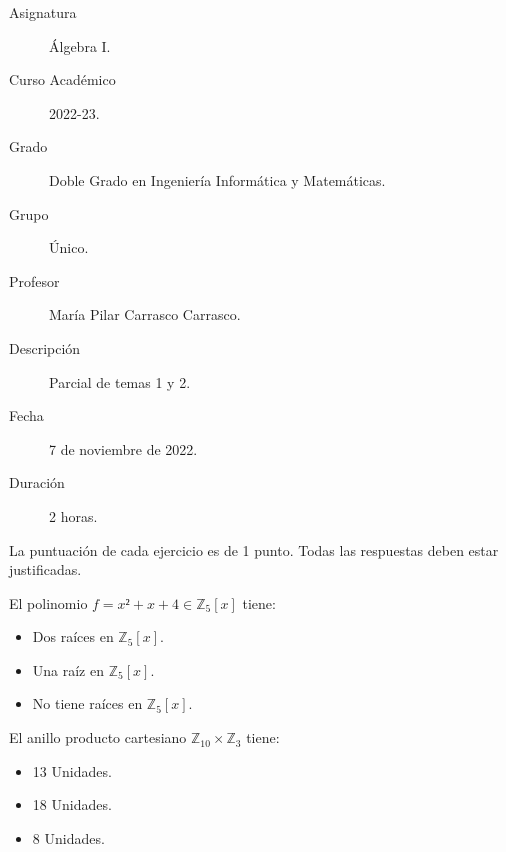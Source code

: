 \documentclass[12pt]{article}
\begin{document}

    
    

    
    \begin{description}
        \item[Asignatura] Álgebra I.
        \item[Curso Académico] 2022-23.
        \item[Grado] Doble Grado en Ingeniería Informática y Matemáticas.
        \item[Grupo] Único.
        \item[Profesor] María Pilar Carrasco Carrasco.
        \item[Descripción] Parcial de temas 1 y 2.
        \item[Fecha] 7 de noviembre de 2022.
        \item[Duración] 2 horas.
    
    \end{description}
    \newpage
    
    \noindent
    La puntuación de cada ejercicio es de 1 punto.\newline
    Todas las respuestas deben estar justificadas.

    \begin{ejercicio}
        El polinomio $f = x² + x + 4 \in \mathbb{Z}_5[x]$ tiene:
        \begin{itemize}
            \item Dos raíces en $\mathbb{Z}_5[x]$.
            \item Una raíz en $\mathbb{Z}_5[x]$.
            \item No tiene raíces en $\mathbb{Z}_5[x]$.
        \end{itemize}
    \end{ejercicio}

    \begin{ejercicio}
        El anillo producto cartesiano $\mathbb{Z}_{10} \times \mathbb{Z}_3$ tiene:
        \begin{itemize}
            \item 13 Unidades.
            \item 18 Unidades.
            \item 8 Unidades.
        \end{itemize}
    \end{ejercicio}
\end{document}
